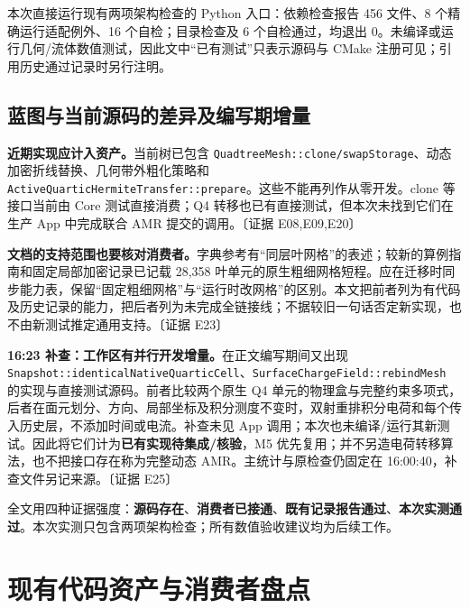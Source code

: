 \documentclass[UTF8,a4paper,11pt,fontset=fandol]{ctexart}
\newcommand{\code}[1]{\nolinkurl{#1}}
\newcommand{\ev}[1]{{\small\color{muted}〔证据 #1〕}}
\newcommand{\decision}[1]{\par\medskip\noindent\colorbox{pale}{\parbox{\dimexpr\linewidth-2\fboxsep}{\strut #1\strut}}\par\medskip}
\begin{document}
本次直接运行现有两项架构检查的 Python 入口：依赖检查报告 456 文件、8 个精确运行适配例外、16 个自检；目录检查及 6 个自检通过，均退出 0。未编译或运行几何/流体数值测试，因此文中“已有测试”只表示源码与 CMake 注册可见；引用历史通过记录时另行注明。

\subsection{蓝图与当前源码的差异及编写期增量}
\textbf{近期实现应计入资产。}当前树已包含 \code{QuadtreeMesh::clone/swapStorage}、动态加密折线替换、几何带外粗化策略和 \code{ActiveQuarticHermiteTransfer::prepare}。这些不能再列作从零开发。clone 等接口当前由 Core 测试直接消费；Q4 转移也已有直接测试，但本次未找到它们在生产 App 中完成联合 AMR 提交的调用。\ev{E08,E09,E20}

\textbf{文档的支持范围也要核对消费者。}字典参考有“同层叶网格”的表述；较新的算例指南和固定局部加密记录已记载 28,358 叶单元的原生粗细网格短程。应在迁移时同步能力表，保留“固定粗细网格”与“运行时改网格”的区别。本文把前者列为有代码及历史记录的能力，把后者列为未完成全链接线；不据较旧一句话否定新实现，也不由新测试推定通用支持。\ev{E23}

\textbf{16:23 补查：工作区有并行开发增量。}在正文编写期间又出现 \code{Snapshot::identicalNativeQuarticCell}、\code{SurfaceChargeField::rebindMesh} 的实现与直接测试源码。前者比较两个原生 Q4 单元的物理盒与完整约束多项式，后者在面元划分、方向、局部坐标及积分测度不变时，双射重排积分电荷和每个传入历史层，不添加时间或电流。补查未见 App 调用；本次也未编译/运行其新测试。因此将它们计为\textbf{已有实现待集成/核验}，M5 优先复用；并不另造电荷转移算法，也不把接口存在称为完整动态 AMR。主统计与原检查仍固定在 16:00:40，补查文件另记来源。\ev{E25}

\decision{全文用四种证据强度：\textbf{源码存在}、\textbf{消费者已接通}、\textbf{既有记录报告通过}、\textbf{本次实测通过}。本次实测只包含两项架构检查；所有数值验收建议均为后续工作。}

\section{现有代码资产与消费者盘点}
\end{document}
